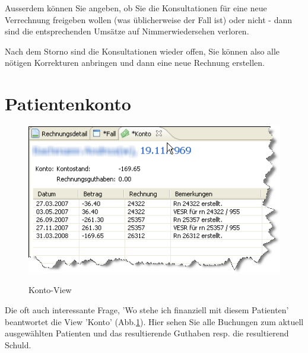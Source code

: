\documentclass[a4paper]{scrartcl}
\begin{document}
Ausserdem können Sie angeben, ob Sie die Konsultationen für eine neue Verrechnung freigeben wollen (was üblicherweise der Fall ist) oder nicht - dann sind die entsprechenden Umsätze auf Nimmerwiedersehen verloren.

\medskip

Nach dem Storno sind die Konsultationen wieder offen, Sie können also alle nötigen Korrekturen anbringen und dann eine neue Rechnung erstellen.

\section{Patientenkonto}
\begin{figure}
  \includegraphics{abr23}\\
  \caption{Konto-View}\label{fig:abr23}
\end{figure}

Die oft auch interessante Frage, 'Wo stehe ich finanziell mit diesem Patienten' beantwortet die View 'Konto' (Abb.\ref{fig:abr23}). Hier sehen Sie alle Buchungen zum aktuell ausgewählten Patienten und das resultierende Guthaben resp. die resultierend Schuld.
\end{document}
